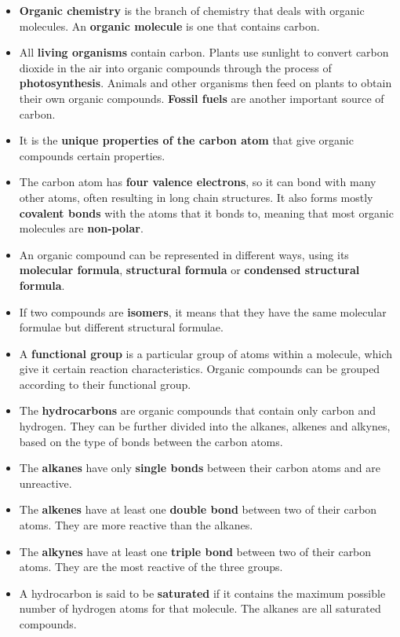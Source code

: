 \begin{itemize}
\item{\textbf{Organic chemistry} is the branch of chemistry that deals with organic molecules. An \textbf{organic molecule} is one that contains carbon.}
\item{All \textbf{living organisms} contain carbon. Plants use sunlight to convert carbon dioxide in the air into organic compounds through the process of \textbf{photosynthesis}. Animals and other organisms then feed on plants to obtain their own organic compounds. \textbf{Fossil fuels} are another important source of carbon.}
\item{It is the \textbf{unique properties of the carbon atom} that give organic compounds certain properties.}
\item{The carbon atom has \textbf{four valence electrons}, so it can bond with many other atoms, often resulting in long chain structures. It also forms mostly \textbf{covalent bonds} with the atoms that it bonds to, meaning that most organic molecules are \textbf{non-polar}.}
\item{An organic compound can be represented in different ways, using its \textbf{molecular formula}, \textbf{structural formula} or \textbf{condensed structural formula}.}
\item{If two compounds are \textbf{isomers}, it means that they have the same molecular formulae but different structural formulae.}
\item{A \textbf{functional group} is a particular group of atoms within a molecule, which give it certain reaction characteristics. Organic compounds can be grouped according to their functional group.}
\item{The \textbf{hydrocarbons} are organic compounds that contain only carbon and hydrogen. They can be further divided into the alkanes, alkenes and alkynes, based on the type of bonds between the carbon atoms.}
\item{The \textbf{alkanes} have only \textbf{single bonds} between their carbon atoms and are unreactive.}
\item{The \textbf{alkenes} have at least one \textbf{double bond} between two of their carbon atoms. They are more reactive than the alkanes.}
\item{The \textbf{alkynes} have at least one \textbf{triple bond} between two of their carbon atoms. They are the most reactive of the three groups.}
\item{A hydrocarbon is said to be \textbf{saturated} if it contains the maximum possible number of hydrogen atoms for that molecule. The alkanes are all saturated compounds.}

\end{itemize}
